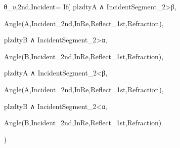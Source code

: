 θ_{υ,2nd,Incident}=
  If(
    plzdtyA ∧ IncidentSegment_{2}>β,

    Angle(A,Incident_{2nd,InRe},Reflect_{1st,Refraction}),

    plzdtyB ∧ IncidentSegment_{2}>α,

    Angle(B,Incident_{2nd,InRe},Reflect_{1st,Refraction}),
    
    plzdtyA ∧ IncidentSegment_{2}<β,

    Angle(A,Incident_{2nd,InRe},Reflect_{1st,Refraction}),

    plzdtyB ∧ IncidentSegment_{2}<α,
    
    Angle(B,Incident_{2nd,InRe},Reflect_{1st,Refraction})

  )